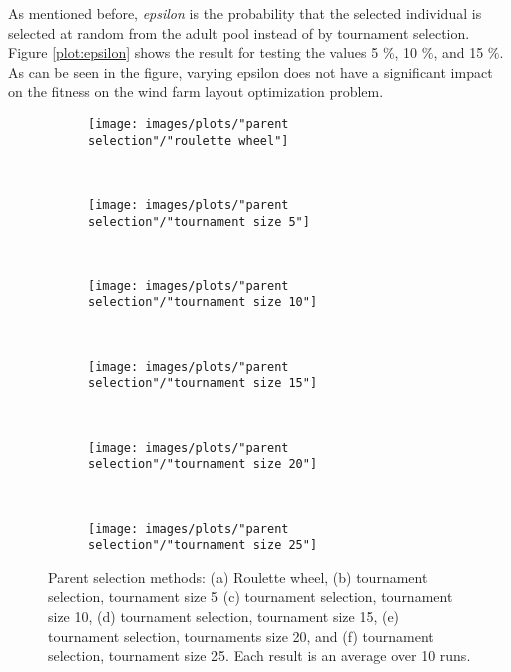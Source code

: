 \noindent As mentioned before, \textit{epsilon} is the probability that the selected individual is selected at random from the adult pool instead of by tournament selection. Figure \ref{plot:epsilon} shows the result for testing the values 5 \%, 10 \%, and 15 \%. As can be seen in the figure, varying epsilon does not have a significant impact on the fitness on the wind farm layout optimization problem.\\


\begin{figure}[h!]
    \centering
    \begin{subfigure}[b]{0.31\textwidth}
        \texttt{[image: images/plots/"parent selection"/"roulette wheel"]}
        \caption{}
        \hfill
        \label{plot:roulette wheel}
    \end{subfigure}
    ~
    \begin{subfigure}[b]{0.31\textwidth}
        \texttt{[image: images/plots/"parent selection"/"tournament size 5"]}
        \caption{}
        \hfill
        \label{plot:tournament size 5}
    \end{subfigure}
    ~
       \begin{subfigure}[b]{0.31\textwidth}
        \texttt{[image: images/plots/"parent selection"/"tournament size 10"]}
        \caption{}
        \hfill
        \label{plot:tournament size 10}
    \end{subfigure}
    ~
       \begin{subfigure}[b]{0.31\textwidth}
        \texttt{[image: images/plots/"parent selection"/"tournament size 15"]}
        \caption{}
        \hfill
        \label{plot:tournament size 15}
    \end{subfigure}
    ~
       \begin{subfigure}[b]{0.31\textwidth}
        \texttt{[image: images/plots/"parent selection"/"tournament size 20"]}
        \caption{}
        \hfill
        \label{plot:tournament size 20}
    \end{subfigure}
    ~
    \begin{subfigure}[b]{0.31\textwidth}
        \texttt{[image: images/plots/"parent selection"/"tournament size 25"]}
        \caption{}
        \hfill
        \label{plot:tournament size 25}
    \end{subfigure}
    \caption{Parent selection methods: (a) Roulette wheel, (b) tournament selection, tournament size 5 (c) tournament selection, tournament size 10, (d) tournament selection, tournament size 15, (e) tournament selection, tournaments size 20, and (f) tournament selection, tournament size 25. Each result is an average over 10 runs.}
    \label{plot:parent selection}
\end{figure}


